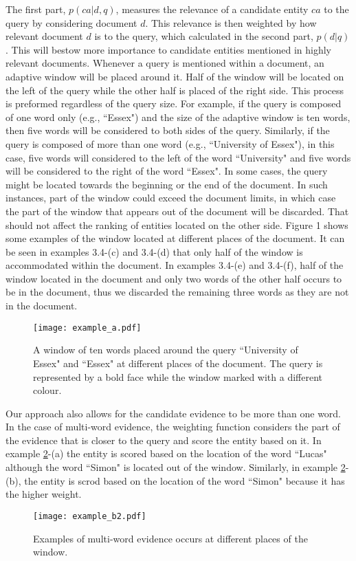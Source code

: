 \documentclass[onepage,a4paper, 12pt]{book}
\begin{document}
	The first part, $p(ca|d,q)$, measures the relevance of a candidate entity $ca$ to the query by considering document $d$. This relevance is then weighted by how relevant document $d$ is to the query, which calculated in the second part, $p(d|q)$. This will bestow more importance to candidate entities mentioned in highly relevant documents.
Whenever a query is mentioned within a document, an adaptive window will be placed around it. Half of the window will be located on the left of the query while the other half is placed of the right side. This process is preformed regardless of the query size. For example, if the query is composed of one word only (e.g., ``Essex") and the size of the adaptive window is ten words, then five words will be considered to both sides of the query. Similarly, if the query is composed of more than one word (e.g., ``University of Essex"), in this case, five words will considered to the left of the word ``University" and five words will be considered to the right of the word ``Essex". In some cases, the query might be located towards the beginning or the end of the document. In such instances, part of the window could exceed the document limits, in which case the part of the window that appears out of the document will be discarded. That should not affect the ranking of entities located on the other side. Figure 1 shows some examples of the window located at different places of the document. It can be seen in examples 3.4-(c) and 3.4-(d) that only half of the window is accommodated within the document. In examples 3.4-(e) and 3.4-(f), half of the window located in the document and only two words of the other half occurs to be in the document, thus we discarded the remaining three words as they are not in the document.
 

\begin{figure}[ht!]
  \centering
  \texttt{[image: example\_a.pdf]}
  \captionsetup{justification=justified,margin=1cm}  
  \caption{A window of ten words placed around the query ``University of Essex" and ``Essex" at different places of the document. The query is represented by a bold face while the window marked with a different colour.}
  \label{fig:WindowExamples}
\end{figure}

Our approach also allows for the candidate evidence to be more than one word. In the case of multi-word evidence, the weighting function considers the part of the evidence that is closer to the query and score the entity based on it. In example \ref{fig:WindowExamples_b}-(a) the entity is scored based on the location of the word ``Lucas" although the word ``Simon" is located out of the window. Similarly, in example \ref{fig:WindowExamples_b}-(b), the entity is scrod based on the location of the word ``Simon" because it has the higher weight. 

\begin{figure}[ht!]
  \centering
  \texttt{[image: example\_b2.pdf]}
    \captionsetup{justification=justified,margin=1cm}  
  \caption{Examples of multi-word evidence occurs at different places of the window.}
  \label{fig:WindowExamples_b}
\end{figure}
\end{document}
